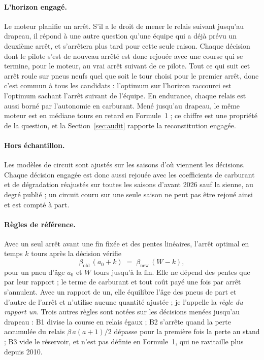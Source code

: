 \documentclass[11pt,a4paper]{article}
\begin{document}
\paragraph{L'horizon engagé.} Le moteur planifie un arrêt. S'il a le droit de
mener le relais suivant jusqu'au drapeau, il répond à une autre question qu'une
équipe qui a déjà prévu un deuxième arrêt, et s'arrêtera plus tard pour cette
seule raison. Chaque décision dont le pilote s'est de nouveau arrêté est donc
rejouée avec une course qui se termine, pour le moteur, au vrai arrêt suivant de
ce pilote. Tout ce qui suit cet arrêt roule sur pneus neufs quel que soit le
tour choisi pour le premier arrêt, donc c'est commun à tous les candidats :
l'optimum sur l'horizon raccourci est l'optimum sachant l'arrêt suivant de
l'équipe. En endurance, chaque relais est aussi borné par l'autonomie en
carburant. Mené jusqu'au drapeau, le même moteur est en médiane \FoneMedian{}
tours en retard en Formule~1 ; ce chiffre est une propriété de la question, et
la Section~\ref{sec:audit} rapporte la reconstitution engagée.

\paragraph{Hors échantillon.} Les modèles de circuit sont ajustés sur les
saisons d'où viennent les décisions. Chaque décision engagée est donc aussi
rejouée avec les coefficients de carburant et de dégradation réajustés sur
toutes les saisons d'avant 2026 sauf la sienne, au degré publié ; un circuit
couru sur une seule saison ne peut pas être rejoué ainsi et est compté à part.

\paragraph{Règles de référence.} Avec un seul arrêt avant une fin fixée et des
pentes linéaires, l'arrêt optimal en temps $k$ tours après la décision vérifie
%
\begin{equation}
\beta_{\mathrm{old}}\,(a_0 + k) \;=\; \beta_{\mathrm{new}}\,(W - k),
\label{eq:closedform}
\end{equation}
%
pour un pneu d'âge $a_0$ et $W$ tours jusqu'à la fin. Elle ne dépend des pentes
que par leur rapport ; le terme de carburant et tout coût payé une fois par arrêt
s'annulent. Avec un rapport de un, elle équilibre l'âge des pneus de part et
d'autre de l'arrêt et n'utilise aucune quantité ajustée ; je l'appelle la
\emph{règle du rapport un}. Trois autres règles sont notées sur les décisions
menées jusqu'au drapeau : B1 divise la course en relais égaux ; B2 s'arrête
quand la perte accumulée du relais $\beta\,a(a+1)/2$ dépasse pour la première
fois la perte au stand ; B3 vide le réservoir, et n'est pas définie en
Formule~1, qui ne ravitaille plus depuis 2010.
\end{document}
